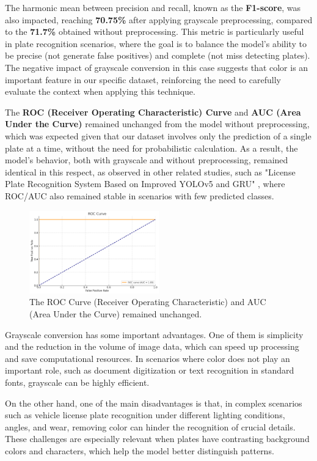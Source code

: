 \documentclass[conference]{IEEEtran}
\begin{document}
	The harmonic mean between precision and recall, known as the \textbf{F1-score}, was also impacted, reaching \textbf{70.75\%} after applying grayscale preprocessing, compared to the \textbf{71.7\%} obtained without preprocessing. This metric is particularly useful in plate recognition scenarios, where the goal is to balance the model's ability to be precise (not generate false positives) and complete (not miss detecting plates). The negative impact of grayscale conversion in this case suggests that color is an important feature in our specific dataset, reinforcing the need to carefully evaluate the context when applying this technique.
	
	The \textbf{ROC (Receiver Operating Characteristic) Curve} and \textbf{AUC (Area Under the Curve)} remained unchanged from the model without preprocessing, which was expected given that our dataset involves only the prediction of a single plate at a time, without the need for probabilistic calculation. As a result, the model's behavior, both with grayscale and without preprocessing, remained identical in this respect, as observed in other related studies, such as "License Plate Recognition System Based on Improved YOLOv5 and GRU" \cite{b8}, where ROC/AUC also remained stable in scenarios with few predicted classes.
	
	\begin{figure}[htbp]
		\centerline{\includegraphics[width=0.5\textwidth]{img7.png}}
		\caption{The ROC Curve (Receiver Operating Characteristic) and AUC (Area Under the Curve) remained unchanged.}
		\label{img7}
	\end{figure}
	
	Grayscale conversion has some important advantages. One of them is simplicity and the reduction in the volume of image data, which can speed up processing and save computational resources. In scenarios where color does not play an important role, such as document digitization or text recognition in standard fonts, grayscale can be highly efficient.
	
	On the other hand, one of the main disadvantages is that, in complex scenarios such as vehicle license plate recognition under different lighting conditions, angles, and wear, removing color can hinder the recognition of crucial details. These challenges are especially relevant when plates have contrasting background colors and characters, which help the model better distinguish patterns.
	
\end{document}
